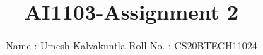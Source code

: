 \documentclass[journal,12pt,twocolumn]{IEEEtran}
\DeclareMathOperator*{\Res}{Res}
\begin{document}
\newcommand{\BEQA}{\begin{eqnarray}}
\newcommand{\EEQA}{\end{eqnarray}}
\newcommand{\define}{\stackrel{\triangle}{=}}

\raggedbottom
\setlength{\parindent}{0pt}
\providecommand{\mbf}{\mathbf}
\providecommand{\pr}[1]{\ensuremath{\Pr\left(#1\right)}}
\providecommand{\qfunc}[1]{\ensuremath{Q\left(#1\right)}}
\providecommand{\sbrak}[1]{\ensuremath{{}\left[#1\right]}}
\providecommand{\lsbrak}[1]{\ensuremath{{}\left[#1\right.}}
\providecommand{\rsbrak}[1]{\ensuremath{{}\left.#1\right]}}
\providecommand{\brak}[1]{\ensuremath{\left(#1\right)}}
\providecommand{\lbrak}[1]{\ensuremath{\left(#1\right.}}
\providecommand{\rbrak}[1]{\ensuremath{\left.#1\right)}}
\providecommand{\cbrak}[1]{\ensuremath{\left\{#1\right\}}}
\providecommand{\lcbrak}[1]{\ensuremath{\left\{#1\right.}}
\providecommand{\rcbrak}[1]{\ensuremath{\left.#1\right\}}}
\theoremstyle{remark}
\newtheorem{rem}{Remark}
\newcommand{\sgn}{\mathop{\mathrm{sgn}}}
\providecommand{\abs}[1]{\vert#1\vert}
\providecommand{\res}[1]{\Res\displaylimits_{#1}} 
\providecommand{\norm}[1]{\lVert#1\rVert}
\providecommand{\mtx}[1]{\mathbf{#1}}
\providecommand{\mean}[1]{E[ #1 ]}
\providecommand{\fourier}{\overset{\mathcal{F}}{ \rightleftharpoons}}
\providecommand{\system}{\overset{\mathcal{H}}{ \longleftrightarrow}}
\newcommand{\solution}{\noindent \textbf{Solution: }}
\newcommand{\cosec}{\,\text{cosec}\,}
\providecommand{\dec}[2]{\ensuremath{\overset{#1}{\underset{#2}{\gtrless}}}}
\newcommand{\myvec}[1]{\ensuremath{\begin{pmatrix}#1\end{pmatrix}}}
\newcommand{\mydet}[1]{\ensuremath{\begin{vmatrix}#1\end{vmatrix}}}
\makeatletter
{}
\makeatother
\let\StandardTheFigure\thefigure
\let\vec\mathbf
\renewcommand{\thefigure}{\theproblem}
\def\putbox#1#2#3{\makebox[0in][l]{\makebox[#1][l]{}\raisebox{\baselineskip}[0in][0in]{\raisebox{#2}[0in][0in]{#3}}}}
     \def\rightbox#1{\makebox[0in][r]{#1}}
     \def\centbox#1{\makebox[0in]{#1}}
     \def\topbox#1{\raisebox{-\baselineskip}[0in][0in]{#1}}
     \def\midbox#1{\raisebox{-0.5\baselineskip}[0in][0in]{#1}}
\vspace{3cm}
\title{AI1103-Assignment 2}
\author{Name : Umesh Kalvakuntla     Roll No. : CS20BTECH11024}
\maketitle
\newpage
\bigskip
\renewcommand{\thefigure}{\theenumi}
\renewcommand{\thetable}{\theenumi}
\end{document}
